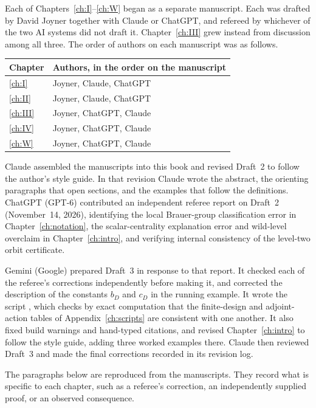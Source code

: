 \documentclass[12pt,letterpaper,oneside]{book}
\theoremstyle{plain}
\theoremstyle{definition}
\begin{document}
Each of Chapters~\ref{ch:I}--\ref{ch:W} began as a separate manuscript.
Each was drafted by David Joyner together with Claude or ChatGPT, and
refereed by whichever of the two AI systems did not draft it.
Chapter~\ref{ch:III} grew instead from discussion among all three. The
order of authors on each manuscript was as follows.
\begin{center}\small
\begin{tabular}{@{}ll@{}}\toprule
Chapter & Authors, in the order on the manuscript\\\midrule
\ref{ch:I} & Joyner, Claude, ChatGPT\\
\ref{ch:II} & Joyner, Claude, ChatGPT\\
\ref{ch:III} & Joyner, ChatGPT, Claude\\
\ref{ch:IV} & Joyner, ChatGPT, Claude\\
\ref{ch:W} & Joyner, ChatGPT, Claude\\
\bottomrule\end{tabular}
\end{center}
Claude assembled the manuscripts into this book and revised Draft~2 to
follow the author's style guide. In that revision Claude wrote the
abstract, the orienting paragraphs that open sections, and the examples
that follow the definitions. ChatGPT (GPT-6) contributed an independent
referee report on Draft~2 (November~14, 2026), identifying the local
Brauer-group classification error in Chapter~\ref{ch:notation}, the
scalar-centrality explanation error and wild-level overclaim in
Chapter~\ref{ch:intro}, and verifying internal consistency of the
level-two orbit certificate.

Gemini (Google) prepared Draft~3 in response to that report. It checked
each of the referee's corrections independently before making it, and
corrected the description of the constants $b_D$ and $c_D$ in the
running example. It wrote the script ,
which checks by exact computation that the finite-design and
adjoint-action tables of Appendix~\ref{ch:scripts} are consistent with
one another. It also fixed build warnings and hand-typed citations, and
revised Chapter~\ref{ch:intro} to follow the style guide, adding three
worked examples there. Claude then reviewed Draft~3 and made the final
corrections recorded in its revision log.

The paragraphs below are reproduced from the manuscripts. They record
what is specific to each chapter, such as a referee's correction, an
independently supplied proof, or an observed consequence.
\end{document}
